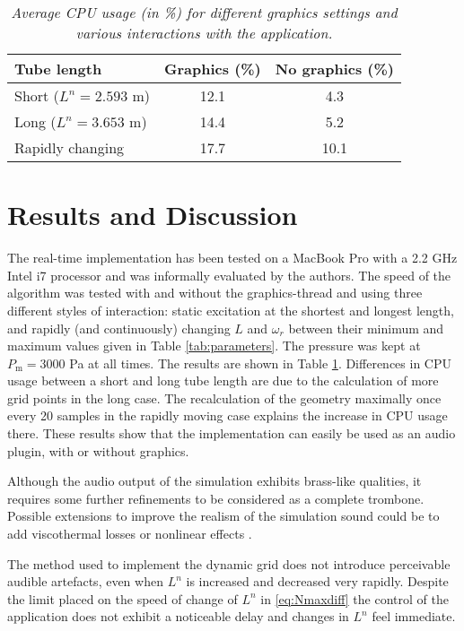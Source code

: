 \begin{table}[t]
    \small
    \begin{center}
    \caption{\it Average CPU usage (in \%) for different graphics settings and various interactions with the application. \label{tab:CPU}}
    \begin{tabular}{|l|c|c|}
        \hline
        Tube length & Graphics (\%) & No graphics (\%)\\\hline
        Short ($L^n = 2.593$ m) & 12.1 & 4.3\\
        Long ($L^n = 3.653$ m) & 14.4 & 5.2 
        \\
        Rapidly changing & 17.7 & 10.1\\\hline    \end{tabular}
    \end{center}
\end{table}

\section{Results and Discussion}\label{sec:resDisc}
The real-time implementation has been tested on a MacBook Pro with a 2.2 GHz Intel i7 processor and was informally evaluated by the authors. The speed of the algorithm was tested with and without the graphics-thread and using three different styles of interaction: static excitation at the shortest and longest length, and rapidly (and continuously) changing $L$ and $\omega_r$ between their minimum and maximum values given in Table \ref{tab:parameters}. The pressure was kept at $P_\text{m} = 3000$ Pa at all times. The results are shown in Table \ref{tab:CPU}. Differences in CPU usage between a short and long tube length are due to the calculation of more grid points in the long case. The recalculation of the geometry maximally once every 20 samples in the rapidly moving case explains the increase in CPU usage there. These results show that the implementation can easily be used as an audio plugin, with or without graphics.

Although the audio output of the simulation exhibits brass-like qualities, it requires some further refinements to be considered as a complete trombone. Possible extensions to improve the realism of the simulation sound could be to add viscothermal losses \cite{Harrison2016} or nonlinear effects \cite{msallam1997physical}.

The method used to implement the dynamic grid does not introduce perceivable audible artefacts, even when $L^n$ is increased and decreased very rapidly. Despite the limit placed on the speed of change of $L^n$ in \eqref{eq:Nmaxdiff} the control of the application does not exhibit a noticeable delay and changes in $L^n$ feel immediate.

